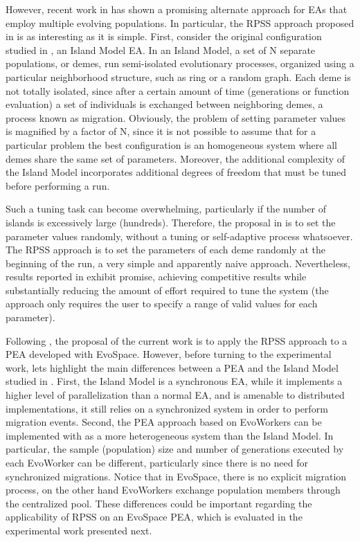 \documentclass{sig-alternate}
\begin{document}
However, recent work in \cite{fuku1,fuku2} has shown a promising alternate approach for EAs that employ multiple evolving populations.
In particular, the RPSS approach proposed in \cite{fuku1} is as interesting as it is simple.
First, consider the original configuration studied in \cite{fuku1,fuku2}, an Island Model EA.
In an Island Model, a set of N separate populations, or demes, run semi-isolated evolutionary processes, organized using a particular
neighborhood structure, such as ring or a random graph.
Each deme is not totally isolated, since after a certain amount of time (generations or function evaluation) a set of individuals is exchanged between
neighboring demes, a process known as migration.
Obviously, the problem of setting parameter values is magnified by a factor of N, since it is not possible to assume that for
a particular problem the best configuration is an homogeneous system where all demes share the same set of parameters.
Moreover, the additional complexity of the Island Model incorporates additional degrees of freedom that must be tuned before
performing a run.

Such a tuning task can become overwhelming, particularly if the number of islands is excessively large (hundreds).
Therefore, the proposal in \cite{fuku1} is to set the parameter values randomly, without a tuning or self-adaptive process whatsoever.
The RPSS approach is to set the parameters of each deme randomly at the beginning of the run, a very simple and apparently naive approach.
Nevertheless, results reported in \cite{fuku1,fuku2} exhibit promise, achieving competitive results while substantially reducing the amount
of effort required to tune the system (the approach only requires the user to specify a range of valid values for each parameter).

Following \cite{fuku1}, the proposal of the current work is to apply the RPSS approach to a PEA developed with EvoSpace.
However, before turning to the experimental work, lets highlight the main differences between a PEA and the Island Model studied in \cite{fuku1,fuku2}.
First, the Island Model is a synchronous EA, while it implements a higher level of parallelization than a normal EA, and is amenable to distributed implementations,
it still relies on a synchronized system in order to perform migration events.
Second, the PEA approach based on EvoWorkers can be implemented with as a more heterogeneous system than the Island Model.
In particular, the sample (population) size and number of generations executed by each EvoWorker can be different,
particularly since there is no need for synchronized migrations.
Notice that in EvoSpace, there is no explicit migration process, on the other hand EvoWorkers exchange population members through the centralized pool.
These differences could be important regarding the applicability of RPSS on an EvoSpace PEA,
which is evaluated in the experimental work presented next.
\end{document}
